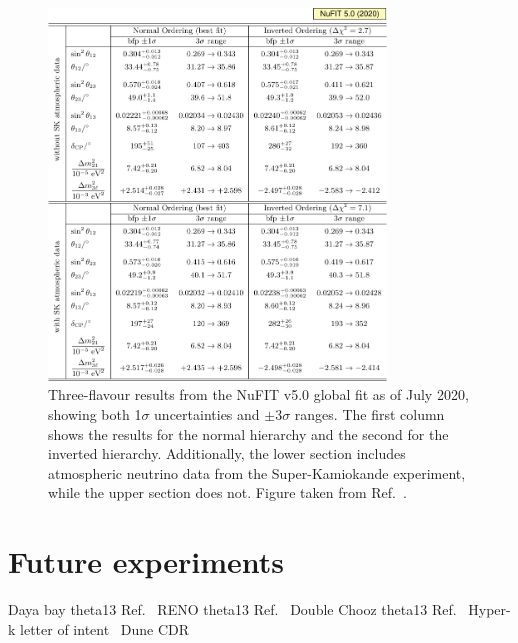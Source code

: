 \begin{figure} %
    \includegraphics[origin=c,width=0.8\textwidth]{diagrams/3-theory/best_fit.pdf}
    \caption[best fit short]
    {Three-flavour results from the NuFIT v5.0 global fit as of July 2020, showing both
        1$\sigma$ uncertainties and $\pm 3 \sigma$ ranges. The first column shows the results
        for the normal hierarchy and the second for the inverted hierarchy. Additionally, the
        lower section includes atmospheric neutrino data from the Super-Kamiokande experiment,
        while the upper section does not. Figure taken from Ref.~\cite{esteban2020}.}
    \label{fig:best_fit}
\end{figure}

\section{Future experiments} %
\label{sec:theory_future} %

Daya bay theta13 Ref.~\cite{an2012}
RENO theta13 Ref.~\cite{ahn2012}
Double Chooz theta13 Ref.~\cite{abe2012}
Hyper-k letter of intent~\cite{abe2011}
Dune CDR~\cite{acciarri2016}

